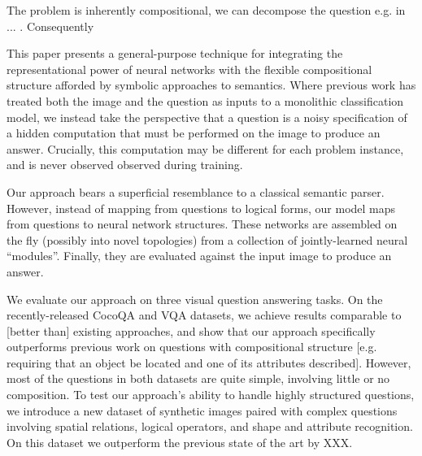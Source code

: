 \documentclass[10pt,twocolumn,letterpaper]{article}
\begin{document}
The problem is inherently compositional, \ie we can decompose the question e.g. in ... .
Consequently



This paper presents a general-purpose technique for integrating the
representational power of neural networks with the flexible compositional
structure afforded by symbolic approaches to semantics.  Where previous work has
treated both the image and the question as inputs to a monolithic classification
model, we instead take the perspective that a question is a noisy specification
of a hidden computation that must be performed on the image to produce an
answer. Crucially, this computation may be different for each problem instance,
and is never observed observed during training.

Our approach bears a superficial resemblance to a classical semantic parser.
However, instead of mapping from questions to logical forms, our model maps from
questions to neural network structures. These networks are assembled on the fly
(possibly into novel topologies) from a collection of jointly-learned neural
``modules''. Finally, they are evaluated against the input image to produce an
answer.





We evaluate our approach on three visual question answering tasks. On the
recently-released CocoQA and VQA datasets, we achieve results comparable to
[better than] existing approaches, and show that our approach specifically outperforms
previous work on questions with compositional structure [e.g. requiring that an
object be located and one of its attributes described]. However, most of the
questions in both datasets are quite simple, involving little or no composition.
To test our approach's ability to handle highly structured questions, we
introduce a new dataset of synthetic images paired with complex questions
involving spatial relations, logical operators, and shape and attribute
recognition. On this dataset we outperform the previous state of the art by XXX.

\end{document}
